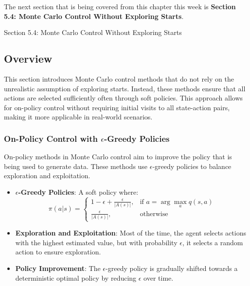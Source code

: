 The next section that is being covered from this chapter this week is \textbf{Section 5.4: Monte Carlo Control Without Exploring Starts}.

\begin{notes}{Section 5.4: Monte Carlo Control Without Exploring Starts}
    \subsection*{Overview}

    This section introduces Monte Carlo control methods that do not rely on the unrealistic assumption of exploring starts. Instead, these methods ensure that all actions are selected sufficiently often 
    through soft policies. This approach allows for on-policy control without requiring initial visits to all state-action pairs, making it more applicable in real-world scenarios.
    
    \subsubsection*{On-Policy Control with $\epsilon$-Greedy Policies}
    
    On-policy methods in Monte Carlo control aim to improve the policy that is being used to generate data. These methods use $\epsilon$-greedy policies to balance exploration and exploitation.
    
    \begin{highlight}
    
        \begin{itemize}
            \item \textbf{$\epsilon$-Greedy Policies}: A soft policy where:
                \[
                \pi(a|s) = 
                \begin{cases}
                1 - \epsilon + \frac{\epsilon}{|A(s)|}, & \text{if } a = \arg\max_a q(s, a) \\
                \frac{\epsilon}{|A(s)|}, & \text{otherwise}
                \end{cases}
                \]
            \item \textbf{Exploration and Exploitation}: Most of the time, the agent selects actions with the highest estimated value, but with probability $\epsilon$, it selects a random action to ensure 
            exploration.
            \item \textbf{Policy Improvement}: The $\epsilon$-greedy policy is gradually shifted towards a deterministic optimal policy by reducing $\epsilon$ over time.
        \end{itemize}
    

\end{highlight}
\end{notes}
